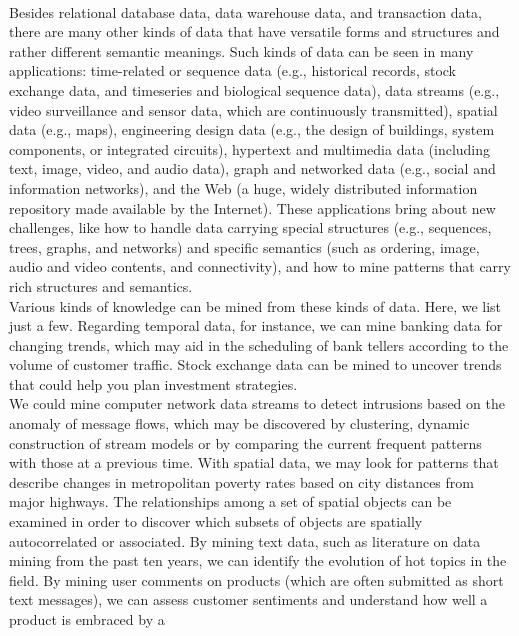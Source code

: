 \paragraph{}
Besides relational database data, data warehouse data, and transaction data, there are many other kinds of data
that have versatile forms and structures and rather different semantic meanings. Such kinds of data can be seen
in many applications: time-related or sequence data (e.g., historical records, stock exchange data, and timeseries and biological sequence data), data streams (e.g., video surveillance and sensor data, which are
continuously transmitted), spatial data (e.g., maps), engineering design data (e.g., the design of buildings,
system components, or integrated circuits), hypertext and multimedia data (including text, image, video, and
audio data), graph and networked data (e.g., social and information networks), and the Web (a huge, widely
distributed information repository made available by the Internet). These applications bring about new
challenges, like how to handle data carrying special structures (e.g., sequences, trees, graphs, and networks)
and specific semantics (such as ordering, image, audio and video contents, and connectivity), and how to mine
patterns that carry rich structures and semantics.
\\
Various kinds of knowledge can be mined from these kinds of data. Here, we list just a few. Regarding
temporal data, for instance, we can mine banking data for changing trends, which may aid in the scheduling of
bank tellers according to the volume of customer traffic. Stock exchange data can be mined to uncover trends
that could help you plan investment strategies. \\We could
mine computer network data streams to detect intrusions based on the anomaly of message flows, which may
be discovered by clustering, dynamic construction of stream models or by comparing the current frequent
patterns with those at a previous time. With spatial data, we may look for patterns that describe changes in
metropolitan poverty rates based on city distances from major highways. The relationships among a set of
spatial objects can be examined in order to discover which subsets of objects are spatially autocorrelated or
associated. By mining text data, such as literature on data mining from the past ten years, we can identify the
evolution of hot topics in the field. By mining user comments on products (which are often submitted as short
text messages), we can assess customer sentiments and understand how well a product is embraced by a
